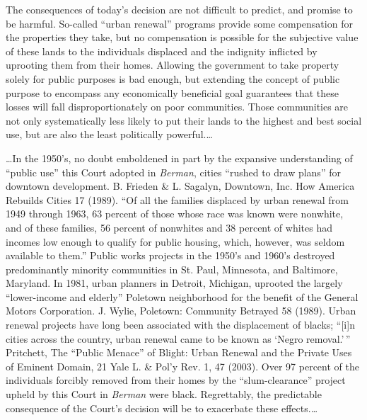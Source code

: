 The consequences of today's decision are not difficult to predict, and promise
to be harmful. So-called ``urban renewal'' programs provide some compensation
for the properties they take, but no compensation is possible for the subjective
value of these lands to the individuals displaced and the indignity inflicted by
uprooting them from their homes. Allowing the government to take property solely
for public purposes is bad enough, but extending the concept of public purpose
to encompass any economically beneficial goal guarantees that these losses will
fall disproportionately on poor communities. Those communities are not only
systematically less likely to put their lands to the highest and best social
use, but are also the least politically powerful.\ldots 

\ldots In the 1950's, no doubt emboldened in part by the expansive understanding
of ``public use'' this Court adopted in \textit{Berman}, cities ``rushed to draw
plans'' for downtown development. B. Frieden \& L. Sagalyn, Downtown, Inc. How
America Rebuilds Cities 17 (1989). ``Of all the families displaced by urban
renewal from 1949 through 1963, 63 percent of those whose race was known were
nonwhite, and of these families, 56 percent of nonwhites and 38 percent of
whites had incomes low enough to qualify for public housing, which, however, was
seldom available to them.'' Public works projects in the 1950's and 1960's
destroyed predominantly minority communities in St. Paul, Minnesota, and
Baltimore, Maryland. In 1981, urban planners in Detroit, Michigan, uprooted the
largely ``lower-income and elderly'' Poletown neighborhood for the benefit of
the General Motors Corporation. J. Wylie, Poletown: Community Betrayed 58
(1989). Urban renewal projects have long been associated with the displacement
of blacks; ``[i]n cities across the country, urban renewal came to be known as
`Negro removal.'\,'' Pritchett, The ``Public Menace'' of Blight: Urban Renewal
and the Private Uses of Eminent Domain, 21 Yale L. \& Pol'y Rev. 1, 47 (2003).
Over 97 percent of the individuals forcibly removed from their homes by the
``slum-clearance'' project upheld by this Court in \textit{Berman} were black.
Regrettably, the predictable consequence of the Court's decision will be to
exacerbate these effects.\ldots


